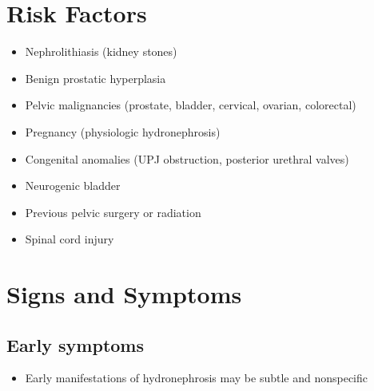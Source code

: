\section{Risk Factors}

\begin{itemize}[noitemsep]
  \item Nephrolithiasis (kidney stones)
  \item Benign prostatic hyperplasia
  \item Pelvic malignancies (prostate, bladder, cervical, ovarian, colorectal)
  \item Pregnancy (physiologic hydronephrosis)
  \item Congenital anomalies (UPJ obstruction, posterior urethral valves)
  \item Neurogenic bladder
  \item Previous pelvic surgery or radiation
  \item Spinal cord injury
\end{itemize}

\section{Signs and Symptoms}

\subsection{Early symptoms}
\begin{itemize}[noitemsep]
  \item Early manifestations of hydronephrosis may be subtle and nonspecific
\end{itemize}

